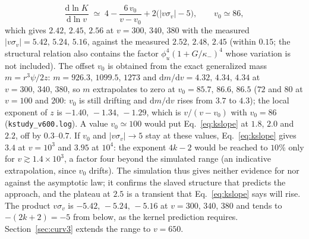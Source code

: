 \documentclass[11pt]{article}
\begin{document}
\begin{equation}
\frac{\mathrm d\ln K}{\mathrm d\ln v}\;\simeq\;4-\frac{6\,v_0}{v-v_0}+2\bigl(|v\sigma_v|-5\bigr),\qquad v_0\simeq86,
\label{eq:kslope}
\end{equation}
which gives $2.42,\,2.45,\,2.56$ at $v=300,\,340,\,380$ with the measured $|v\sigma_v|=5.42,\,5.24,\,5.16$, against the measured $2.52,\,2.48,\,2.45$ (within $0.15$; the structural relation also contains the factor $\phi_u^{4}(1+G/\kappa_-)^{4}$ whose variation is not included). The offset $v_0$ is obtained from the exact generalized mass $m=r^{3}\psi/2z$: $m=926.3,\,1099.5,\,1273$ and $\mathrm{d}m/\mathrm{d}v=4.32,\,4.34,\,4.34$ at $v=300,\,340,\,380$, so $m$ extrapolates to zero at $v_0=85.7,\,86.6,\,86.5$ ($72$ and $80$ at $v=100$ and $200$: $v_0$ is still drifting and $\mathrm{d}m/\mathrm{d}v$ rises from $3.7$ to $4.3$); the local exponent of $z$ is $-1.40,\,-1.34,\,-1.29$, which is $v/(v-v_0)$ with $v_0=86$ (\texttt{kstudy\_v600.log}). A value $v_0\simeq100$ would put Eq.~\eqref{eq:kslope} at $1.8$, $2.0$ and $2.2$, off by $0.3$--$0.7$. If $v_0$ and $|v\sigma_v|\to5$ stay at these values, Eq.~\eqref{eq:kslope} gives $3.4$ at $v=10^{3}$ and $3.95$ at $10^{4}$: the exponent $4k-2$ would be reached to $10\%$ only for $v\gtrsim1.4\times10^{3}$, a factor four beyond the simulated range (an indicative extrapolation, since $v_0$ drifts). The simulation thus gives neither evidence for nor against the asymptotic law; it confirms the slaved structure that predicts the approach, and the plateau at $2.5$ is a transient that Eq.~\eqref{eq:kslope} says will rise. The product $v\sigma_v$ is $-5.42,\,-5.24,\,-5.16$ at $v=300,\,340,\,380$ and tends to $-(2k+2)=-5$ from below, as the kernel prediction requires. Section~\ref{sec:curv3} extends the range to $v=650$.
\end{document}
